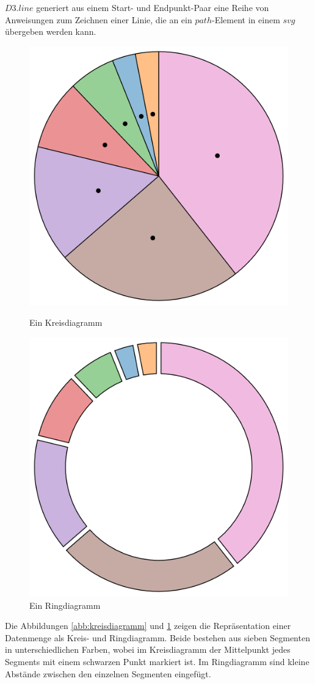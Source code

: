 $D3.line$ generiert aus einem Start- und Endpunkt-Paar eine Reihe von Anweisungen zum Zeichnen einer Linie, die an ein $path$-Element in einem $svg$ übergeben werden kann. 
\begin{figure}
	\centering
	\begin{minipage}{.5\textwidth}
	\centering
	\includegraphics[width=.8\linewidth]{../screenshots/kreisdiagramm.PNG}
	\caption{Ein Kreisdiagramm}
	\label{abb:kreisdiagramm}
	\end{minipage}%
	\begin{minipage}{.5\textwidth}
	\centering
	\includegraphics[width=.8\linewidth]{../screenshots/donutchart.PNG}
	\caption{Ein Ringdiagramm}
	\label{abb:donut}
	\end{minipage}
\end{figure}
Die Abbildungen \ref{abb:kreisdiagramm} und \ref{abb:donut}  zeigen die Repräsentation einer Datenmenge als Kreis- und Ringdiagramm. Beide bestehen aus sieben Segmenten in unterschiedlichen Farben, wobei im Kreisdiagramm der Mittelpunkt jedes Segments mit einem schwarzen Punkt markiert ist. Im Ringdiagramm sind kleine Abstände zwischen den einzelnen Segmenten eingefügt.

